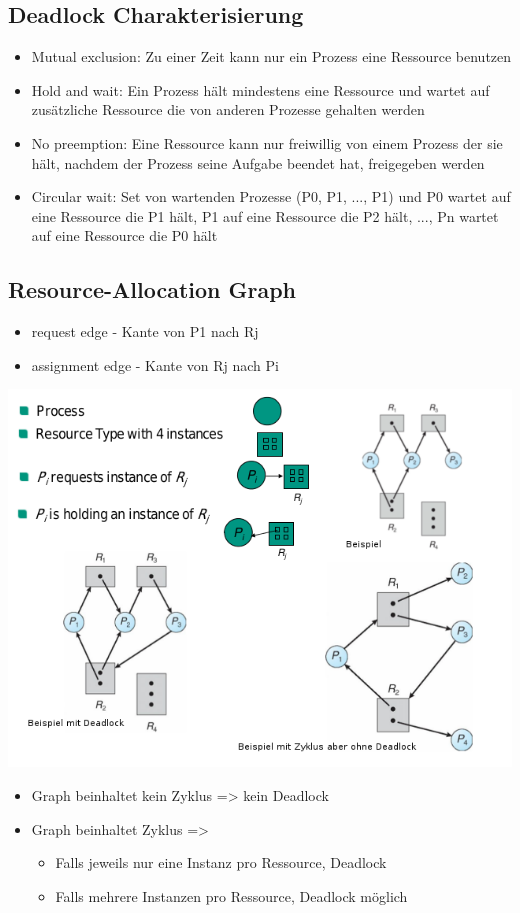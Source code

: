 \documentclass[a4paper]{scrreprt}
\begin{document}
		\subsection{Deadlock Charakterisierung}
			\begin{itemize}
				\item Mutual exclusion: Zu einer Zeit kann nur ein Prozess eine Ressource benutzen
				\item Hold and wait: Ein Prozess hält mindestens eine Ressource und wartet auf zusätzliche Ressource die von anderen Prozesse gehalten werden
				\item No preemption: Eine Ressource kann nur freiwillig von einem Prozess der sie hält, nachdem der Prozess seine Aufgabe beendet hat, freigegeben werden
				\item Circular wait: Set von wartenden Prozesse (P0, P1, ..., P1) und P0 wartet auf eine Ressource die P1 hält, P1 auf eine Ressource die P2 hält, ..., Pn wartet auf eine Ressource die P0 hält
			\end{itemize}
		\subsection{Resource-Allocation Graph}
			\begin{itemize}
				\item request edge - Kante von P1 nach Rj
				\item assignment edge - Kante von Rj nach Pi
			\end{itemize}
		\includegraphics[scale=0.7]{graphics/resallograph.png}
			\begin{itemize}
				\item Graph beinhaltet kein Zyklus => kein Deadlock
				\item Graph beinhaltet Zyklus =>
					\begin{itemize}
						\item Falls jeweils nur eine Instanz pro Ressource, Deadlock
						\item Falls mehrere Instanzen pro Ressource, Deadlock möglich
					\end{itemize}
			\end{itemize}
\end{document}
